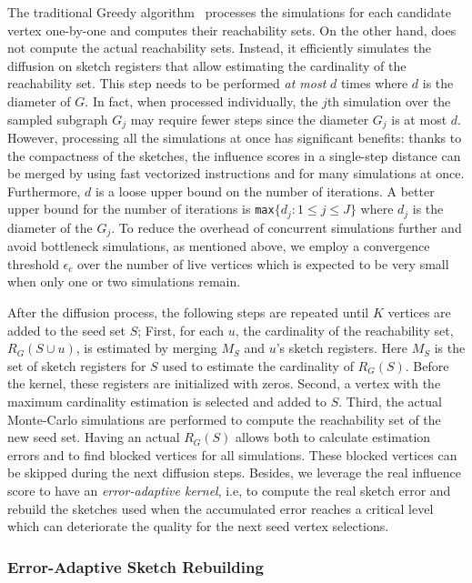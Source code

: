 \documentclass[10pt,journal,compsoc]{IEEEtran}
\newcommand\acro{{\sc{HyperFuseR\xspace}\xspace}\xspace}
\begin{document}
The traditional Greedy algorithm~\cite{kempe2003maximizing} processes the simulations for each candidate vertex one-by-one and computes their reachability sets. On the other hand, \acro does not compute the actual reachability sets. Instead, it efficiently simulates the diffusion on sketch registers that allow estimating the cardinality of the reachability set. This step needs to be performed {\em at most} $d$ times where $d$ is the diameter of $G$. In fact, when processed individually, the $j$th simulation over the sampled subgraph $G_j$ may require fewer steps since the diameter $G_j$ is at most $d$. However, processing all the simulations at once has significant benefits: thanks to the compactness of the sketches, the influence scores in a single-step distance can be merged by using fast vectorized instructions and for many simulations at once. Furthermore, $d$ is a loose upper bound on the number of iterations. A better upper bound for the number of \acro iterations is {\tt max}$\{d_j: 1 \leq j \leq J\}$ where $d_j$ is the diameter of the $G_j$. To reduce the overhead of concurrent simulations further and avoid bottleneck simulations, as mentioned above, we employ a convergence threshold $\epsilon_c$ over the number of live vertices which is expected to be very small when only one or two simulations remain. 

After the diffusion process, the following steps are repeated until $K$ vertices are added to the seed set $S$; First, for each $u$, the cardinality of the reachability set, $R_G(S\cup u)$, is estimated by merging $M_S$ and $u$'s sketch registers. Here $M_S$ is the set of sketch registers for $S$ used to estimate the cardinality of $R_G(S)$. Before the kernel, these registers are initialized with zeros. Second, a vertex with the maximum cardinality estimation is selected and added to $S$. Third, the actual Monte-Carlo simulations are performed to compute the reachability set of the new seed set. Having an actual $R_G(S)$ allows both to calculate estimation errors and to find blocked vertices for all simulations. These blocked vertices can be skipped during the next diffusion steps. Besides, we leverage the real influence score to have an {\em error-adaptive kernel}, i.e, to compute the real sketch error and rebuild the sketches used when the accumulated error reaches a critical level which can deteriorate the quality for the next seed vertex selections. 


\subsubsection{Error-Adaptive Sketch Rebuilding}
\end{document}
